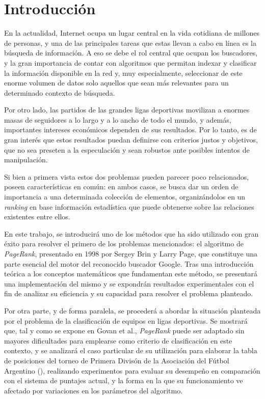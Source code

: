 \section{Introducción}

    En la actualidad, Internet ocupa un lugar central en la vida cotidiana de millones de personas, y una de las principales tareas que estas llevan a cabo en línea es la búsqueda de información. A eso se debe el rol central que ocupan los buscadores, y la gran importancia de contar con algoritmos que permitan indexar y clasificar la información disponible en la red y, muy especialmente, seleccionar de este enorme volumen de datos solo aquellos que sean más relevantes para un determinado contexto de búsqueda.

    Por otro lado, las partidos de las grandes ligas deportivas movilizan a enormes masas de seguidores a lo largo y a lo ancho de todo el mundo, y además, importantes intereses económicos dependen de sus resultados. Por lo tanto, es de gran interés que estos resultados puedan definirse con criterios justos y objetivos, que no sea preseten a la especulación y sean robustos ante posibles intentos de manipulación.

    Si bien a primera vista estos dos problemas pueden parecer poco relacionados, poseen características en común: en ambos casos, se busca dar un orden de importancia a una determinada colección de elementos, organizándolos en un \emph{ranking} en base información estadística que puede obtenerse sobre las relaciones existentes entre ellos.

    En este trabajo, se introducirá uno de los métodos que ha sido utilizado con gran éxito para resolver el primero de los problemas mencionados: el algoritmo de \emph{PageRank}, presentado en 1998 por Sergey Brin y Larry Page\cite{Brin1998}, que constituye una parte esencial del motor del reconocido buscador Google. Tras una introducción teórica a los conceptos matemáticos que fundamentan este método, se presentará una implementación del mismo y se expondrán resultados experimentales con el fin de analizar su eficiencia y su capacidad para resolver el problema planteado.

    Por otra parte, y de forma paralela, se procederá a abordar la situación planteada por el problema de la clasificación de equipos en ligas deportivas. Se mostrará que, tal y como se expone en Govan et al.\cite{Govan2008}, \emph{PageRank} puede ser adaptado sin mayores dificultades para emplearse como criterio de clasificación en este contexto, y se analizará el caso particular de su utilización para elaborar la tabla de posiciones del torneo de Primera Divisón de la Asociación del Fútbol Argentino (), realizando experimentos para evaluar su desempeño en comparación con el sistema de puntajes actual, y la forma en la que su funcionamiento ve afectado por variaciones en los parámetros del algoritmo.

